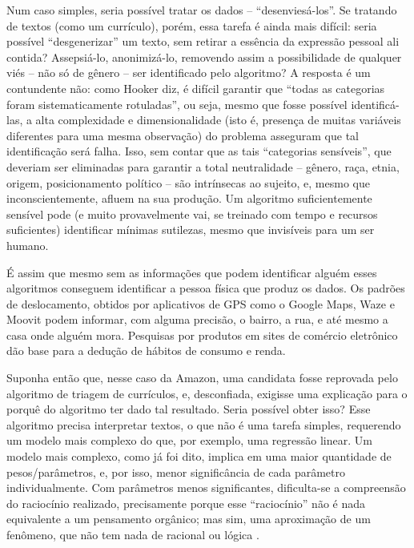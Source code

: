 Num caso simples, seria possível tratar os dados -- ``desenviesá-los''.
Se tratando de textos (como um currículo), porém, essa tarefa é ainda mais difícil: seria possível ``desgenerizar'' um texto, sem retirar a essência da expressão pessoal ali contida?
Assepsiá-lo, anonimizá-lo, removendo assim a possibilidade de qualquer viés -- não só de gênero -- ser identificado pelo algoritmo?
A resposta é um contundente não: como Hooker diz, é difícil garantir que ``todas as categorias foram sistematicamente rotuladas'', ou seja, mesmo que fosse possível identificá-las, a alta complexidade e dimensionalidade (isto é, presença de muitas variáveis diferentes para uma mesma observação) do problema asseguram que tal identificação será falha.
Isso, sem contar que as tais ``categorias sensíveis'', que deveriam ser eliminadas para garantir a total neutralidade -- gênero, raça, etnia, origem, posicionamento político -- são intrínsecas ao sujeito, e, mesmo que inconscientemente, afluem na sua produção.
Um algoritmo suficientemente sensível pode (e muito provavelmente vai, se treinado com tempo e recursos suficientes) identificar mínimas sutilezas, mesmo que invisíveis para um ser humano.

É assim que mesmo sem as informações que podem identificar alguém esses algoritmos conseguem identificar a pessoa física que produz os dados.
Os padrões de deslocamento, obtidos por aplicativos de GPS como o Google Maps, Waze e Moovit podem informar, com alguma precisão, o bairro, a rua, e até mesmo a casa onde alguém mora.
Pesquisas por produtos em sites de comércio eletrônico dão base para a dedução de hábitos de consumo e renda.

Suponha então que, nesse caso da Amazon, uma candidata fosse reprovada pelo algoritmo de triagem de currículos, e, desconfiada, exigisse uma explicação para o porquê do algoritmo ter dado tal resultado.
Seria possível obter isso?
Esse algoritmo precisa interpretar textos, o que não é uma tarefa simples, requerendo um modelo mais complexo do que, por exemplo, uma regressão linear.
Um modelo mais complexo, como já foi dito, implica em uma maior quantidade de pesos/parâmetros, e, por isso, menor significância de cada parâmetro individualmente.
Com parâmetros menos significantes, dificulta-se a compreensão do raciocínio realizado, precisamente porque esse ``raciocínio'' não é nada equivalente a um pensamento orgânico; mas sim, uma aproximação de um fenômeno, que não tem nada de racional ou lógica \cite{aïvodji_fairwashing_2019}.

